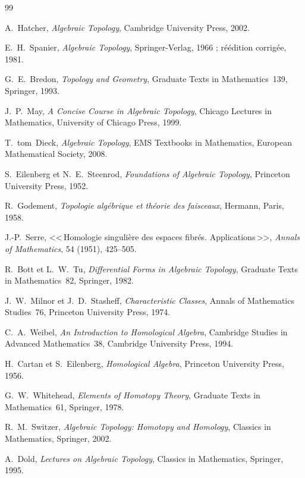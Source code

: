 \documentclass[12pt,a4paper,openany]{book}
\theoremstyle{definition}
\theoremstyle{plain}
\theoremstyle{remark}
\begin{document}
\begin{thebibliography}{99}

  A.~Hatcher,
  \emph{Algebraic Topology},
  Cambridge University Press, 2002.

  E.~H.~Spanier,
  \emph{Algebraic Topology},
  Springer-Verlag, 1966 ; réédition corrigée, 1981.

  G.~E.~Bredon,
  \emph{Topology and Geometry},
  Graduate Texts in Mathematics~139, Springer, 1993.

  J.~P.~May,
  \emph{A Concise Course in Algebraic Topology},
  Chicago Lectures in Mathematics, University of Chicago Press, 1999.

  T.~tom~Dieck,
  \emph{Algebraic Topology},
  EMS Textbooks in Mathematics, European Mathematical Society, 2008.

  S.~Eilenberg et N.~E.~Steenrod,
  \emph{Foundations of Algebraic Topology},
  Princeton University Press, 1952.

  R.~Godement,
  \emph{Topologie algébrique et théorie des faisceaux},
  Hermann, Paris, 1958.

  J.-P.~Serre,
  <<\,Homologie singulière des espaces fibrés. Applications\,>>,
  \emph{Annals of Mathematics}, 54 (1951), 425--505.

  R.~Bott et L.~W.~Tu,
  \emph{Differential Forms in Algebraic Topology},
  Graduate Texts in Mathematics~82, Springer, 1982.

  J.~W.~Milnor et J.~D.~Stasheff,
  \emph{Characteristic Classes},
  Annals of Mathematics Studies~76, Princeton University Press, 1974.

  C.~A.~Weibel,
  \emph{An Introduction to Homological Algebra},
  Cambridge Studies in Advanced Mathematics~38, Cambridge University Press, 1994.

  H.~Cartan et S.~Eilenberg,
  \emph{Homological Algebra},
  Princeton University Press, 1956.

  G.~W.~Whitehead,
  \emph{Elements of Homotopy Theory},
  Graduate Texts in Mathematics~61, Springer, 1978.

  R.~M.~Switzer,
  \emph{Algebraic Topology: Homotopy and Homology},
  Classics in Mathematics, Springer, 2002.

  A.~Dold,
  \emph{Lectures on Algebraic Topology},
  Classics in Mathematics, Springer, 1995.

\end{thebibliography}


\printindex
\end{document}
